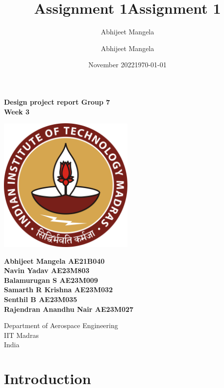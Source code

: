 \documentclass[12 pt]{article}
\title{Assignment 1}
\author{Abhijeet Mangela}
\date{November 2022}
\title{Assignment 1}
\author{Abhijeet Mangela}
\date{\today}
\begin{document}
\begin{titlepage}
\begin{center}

\textbf{\huge Design project report Group 7 \\ \vspace{0.4 cm} Week 3} \\

\vspace{2 cm}

\centering
\includegraphics[width=0.5\textwidth]{IIT_Madras_Logo.svg.png}
\label{fig:my_label}

\vspace{1cm}

\textbf{Abhijeet Mangela AE21B040 \\ Navin Yadav AE23M803 \\ Balamurugan S AE23M009 \\ Samarth R Krishna AE23M032 \\ Senthil B AE23M035 \\ Rajendran Anandhu Nair AE23M027 }

\vspace{0.5cm}

\footnotesize Department of Aerospace Engineering \\
IIT Madras \\
India

\normalsize

\end{center}
\end{titlepage}


\newpage

\tableofcontents

\newpage

\thispagestyle{empty}
\listoffigures
\listoftables
\newpage


\section{Introduction}
\end{document}
